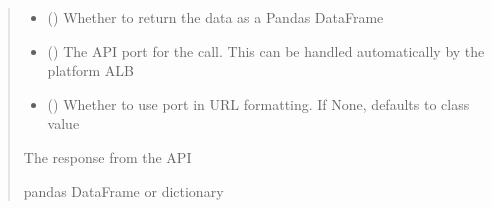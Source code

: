 \documentclass[letterpaper,10pt,english]{sphinxmanual}
\begin{document}
\begin{fulllineitems}
\begin{fulllineitems}
\begin{quote}
\begin{description}
\begin{itemize}
\item {} 
\sphinxAtStartPar
{} (\sphinxstyleliteralemphasis{\sphinxupquote{ (}}\sphinxstyleliteralemphasis{\sphinxupquote{)}}) \textendash{} Whether to return the data as a Pandas DataFrame

\item {} 
\sphinxAtStartPar
{} (\sphinxstyleliteralemphasis{\sphinxupquote{ (}}\sphinxstyleliteralemphasis{\sphinxupquote{)}}) \textendash{} The API port for the call. This can be handled automatically by the platform ALB

\item {} 
\sphinxAtStartPar
{} (\sphinxstyleliteralemphasis{\sphinxupquote{ (}}\sphinxstyleliteralemphasis{\sphinxupquote{)}}) \textendash{} Whether to use port in URL formatting. If None, defaults to class value

\end{itemize}

\sphinxAtStartPar
{} \textendash{} The response from the API

\sphinxAtStartPar
pandas DataFrame or dictionary

\end{description}\end{quote}

\end{fulllineitems}



\end{fulllineitems}
\end{document}
